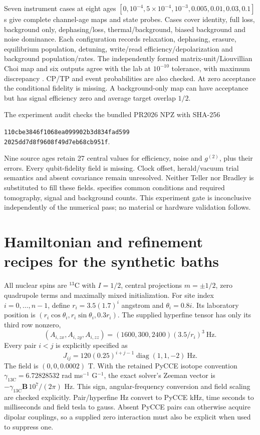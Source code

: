 Seven instrument cases at eight ages $[0,10^{-4},5\times10^{-4},10^{-3},0.005,0.01,0.03,0.1]$ s give \ProtoPoints{} complete channel-age maps and \ProtoProbes{} state probes. Cases cover identity, full loss, background only, dephasing/loss, thermal/background, biased background and noise dominance. Each configuration records relaxation, dephasing, erasure, equilibrium population, detuning, write/read efficiency/depolarization and background population/rates. The independently formed matrix-unit/Liouvillian Choi map and six outputs agree with the lab at $10^{-10}$ tolerance, with maximum discrepancy \ProtoError{}. CP/TP and event probabilities are also checked. At zero acceptance the conditional fidelity is missing. A background-only map can have acceptance but has signal efficiency zero and average target overlap $1/2$.

The experiment audit checks the bundled PR2026 NPZ with SHA-256
\par\noindent\begin{minipage}{\linewidth}\centering\small\texttt{110cbe3846f1068ea099902b3d834fad599}\\\texttt{2025dd7d8f9608f49d7eb68cb951f}.\end{minipage}\par
Nine source ages retain 27 central values for efficiency, noise and $g^{(2)}$, plus their errors. Every qubit-fidelity field is missing. Clock offset, herald/vacuum trial semantics and absent covariance remain unresolved. Neither Teller nor Bradley is substituted to fill these fields.  specifies common conditions and required tomography, signal and background counts. This experiment gate is inconclusive independently of the numerical pass; no material or hardware validation follows.

\section{Hamiltonian and refinement recipes for the synthetic baths}
All nuclear spins are $^{13}$C with $I=1/2$, central projections $m=\pm1/2$, zero quadrupole terms and maximally mixed initialization. For site index $i=0,\ldots,n-1$, define $r_i=3.5(1.7)^i$ angstrom and $\theta_i=0.8i$. Its laboratory position is $(r_i\cos\theta_i,r_i\sin\theta_i,0.3r_i)$. The supplied hyperfine tensor has only its third row nonzero,
\[
(A_{i,zx},A_{i,zy},A_{i,zz})=(1600,300,2400)(3.5/r_i)^3\ \mathrm{Hz}.
\]
Every pair $i<j$ is explicitly specified as
\[
J_{ij}=120(0.25)^{i+j-1}\operatorname{diag}(1,1,-2)\ \mathrm{Hz}.
\]
The field is $(0,0,0.0002)$ T. With the retained PyCCE isotope convention $\gamma_{13\mathrm C}=6.72828532$ rad ms$^{-1}$ G$^{-1}$, the exact solver's Zeeman vector is $-\gamma_{13\mathrm C}\mathbf B\,10^7/(2\pi)$ Hz. This sign, angular-frequency conversion and field scaling are checked explicitly. Pair/hyperfine Hz convert to PyCCE kHz, time seconds to milliseconds and field tesla to gauss. Absent PyCCE pairs can otherwise acquire dipolar couplings, so a supplied zero interaction must also be explicit when used to suppress one.

